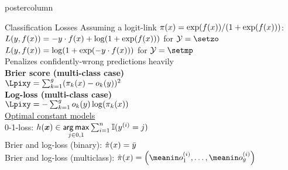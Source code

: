 \documentclass{beamer}
\begin{document}
\begin{frame}[fragile]{}
\begin{columns}
\begin{column}{.31\textwidth}
\begin{beamercolorbox}[center]{postercolumn}
\begin{minipage}{.98\textwidth}
{\begin{myblock}{Classification Losses}
Assuming a logit-link $\pi(x) = \exp(f(x)) / ( 1+\exp(f(x)))$:\\
$L(y, f(x)) = -y \cdot f(x) + \log(1 + \exp(f(x)))$ for $\Yspace = \setzo$ \\
$L(y, f(x)) = \log(1 + \exp(- y \cdot f(x)))$ for $\Yspace = \setmp$ \\
Penalizes confidently-wrong predictions heavily\\

\textbf{Brier score (multi-class case)} \\
$\Lpixy =  \sumkg (\pikx - o_k(y))^2$ \\

\textbf{Log-loss (multi-class case)} \\
$ \Lpixy =  - \sumkg o_k(y) \log(\pikx)$ \\  %

\underline{Optimal constant models}\\[-1ex]
0-1-loss: $h(\bm{x}) \in \mathop{\sf arg\,max} \limits_{j \in {0,1}} \sum_{i=1}^n \mathbb{I}(y^{(i)} = j) $\\
Brier and log-loss (binary): $\hat \pi(x) = \bar{y}$\\
Brier and log-loss (multiclass): $\pixh = \left(\meanin o_1^{(i)}, \dots, \meanin o_g^{(i)}\right)$ 


\end{myblock}

%             


  

}
\end{minipage}
\end{beamercolorbox}
\end{column}
\end{columns}
\end{frame}
\end{document}
